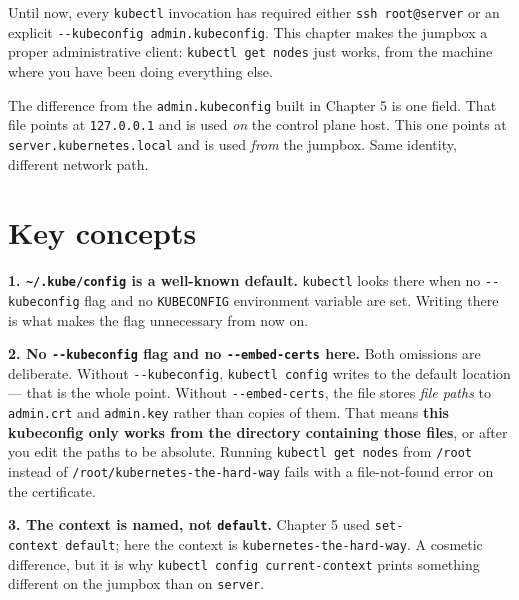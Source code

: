 \documentclass[11pt,oneside]{report}
\begin{document}
\begin{whybox}

Until now, every
\texttt{kubectl}
invocation has
required either
\texttt{ssh\ root@server}
or an explicit
\texttt{-\/-kubeconfig\ admin.}\allowbreak{}\texttt{kubeconfig}.
This chapter makes
the jumpbox a proper
administrative
client:
\texttt{kubectl\ get\ nodes}
just works, from the
machine where you
have been doing
everything else.

\end{whybox}

The difference from
the
\texttt{admin.}\allowbreak{}\texttt{kubeconfig}
built in Chapter 5
is one field. That
file points at
\texttt{127.0.0.1}
and is used
\emph{on} the
control plane host.
This one points at
\texttt{server.}\allowbreak{}\texttt{kubernetes.}\allowbreak{}\texttt{local}
and is used
\emph{from} the
jumpbox. Same
identity, different
network path.

\hypertarget{key-concepts-10}{%
\section{Key
concepts}\label{key-concepts-10}}

\textbf{1.
\texttt{\textasciitilde{}/.kube/config}
is a well-known
default.}
\texttt{kubectl}
looks there when no
\texttt{-\/-kubeconfig}
flag and no
\texttt{KUBECONFIG}
environment variable
are set. Writing
there is what makes
the flag unnecessary
from now on.

\textbf{2. No
\texttt{-\/-kubeconfig}
flag and no
\texttt{-\/-embed-certs}
here.} Both
omissions are
deliberate. Without
\texttt{-\/-kubeconfig},
\texttt{kubectl\ config}
writes to the
default location ---
that is the whole
point. Without
\texttt{-\/-embed-certs},
the file stores
\emph{file paths} to
\texttt{admin.crt}
and
\texttt{admin.key}
rather than copies
of them. That means
\textbf{this
kubeconfig only
works from the
directory containing
those files}, or
after you edit the
paths to be
absolute. Running
\texttt{kubectl\ get\ nodes}
from \texttt{/root}
instead of
\texttt{/}\allowbreak{}\texttt{root/}\allowbreak{}\texttt{kubernetes-}\allowbreak{}\texttt{the-}\allowbreak{}\texttt{hard-}\allowbreak{}\texttt{way}
fails with a
file-not-found error
on the certificate.

\textbf{3. The
context is named,
not
\texttt{default}.}
Chapter 5 used
\texttt{set-}\allowbreak{}\texttt{context\ default};
here the context is
\texttt{kubernetes-}\allowbreak{}\texttt{the-}\allowbreak{}\texttt{hard-}\allowbreak{}\texttt{way}.
A cosmetic
difference, but it
is why
\texttt{kubectl\ config\ current-}\allowbreak{}\texttt{context}
prints something
different on the
jumpbox than on
\texttt{server}.
\end{document}
